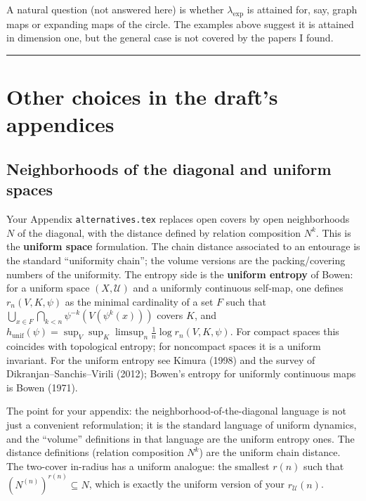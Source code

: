 \documentclass[
]{article}
\begin{document}
A natural question (not answered here) is whether \(\lambda_{\exp}\) is
attained for, say, graph maps or expanding maps of the circle. The
examples above suggest it is attained in dimension one, but the general
case is not covered by the papers I found.

\begin{center}\rule{0.5\linewidth}{0.5pt}\end{center}

\section{Other choices in the draft's
appendices}\label{other-choices-in-the-drafts-appendices}

\subsection{Neighborhoods of the diagonal and uniform
spaces}\label{neighborhoods-of-the-diagonal-and-uniform-spaces}

Your Appendix \texttt{alternatives.tex} replaces open covers by open
neighborhoods \(N\) of the diagonal, with the distance defined by
relation composition \(N^k\). This is the \textbf{uniform space}
formulation. The chain distance associated to an entourage is the
standard ``uniformity chain''; the volume versions are the
packing/covering numbers of the uniformity. The entropy side is the
\textbf{uniform entropy} of Bowen: for a uniform space
\((X,\mathcal U)\) and a uniformly continuous self-map, one defines
\(r_n(V,K,\psi)\) as the minimal cardinality of a set \(F\) such that
\(\bigcup_{x\in F}\bigcap_{k<n}\psi^{-k}(V(\psi^k(x)))\) covers \(K\),
and
\(h_{\mathrm{unif}}(\psi)=\sup_V\sup_K\limsup_n\frac1n\log r_n(V,K,\psi)\).
For compact spaces this coincides with topological entropy; for
noncompact spaces it is a uniform invariant. For the uniform entropy see
Kimura (1998) and the survey of Dikranjan--Sanchis--Virili (2012);
Bowen's entropy for uniformly continuous maps is Bowen (1971).

The point for your appendix: the neighborhood-of-the-diagonal language
is not just a convenient reformulation; it is the standard language of
uniform dynamics, and the ``volume'' definitions in that language are
the uniform entropy ones. The distance definitions (relation composition
\(N^k\)) are the uniform chain distance. The two-cover in-radius has a
uniform analogue: the smallest \(r(n)\) such that
\((N^{(n)})^{r(n)}\subseteq N\), which is exactly the uniform version of
your \(r_{\mathcal U}(n)\).
\end{document}
